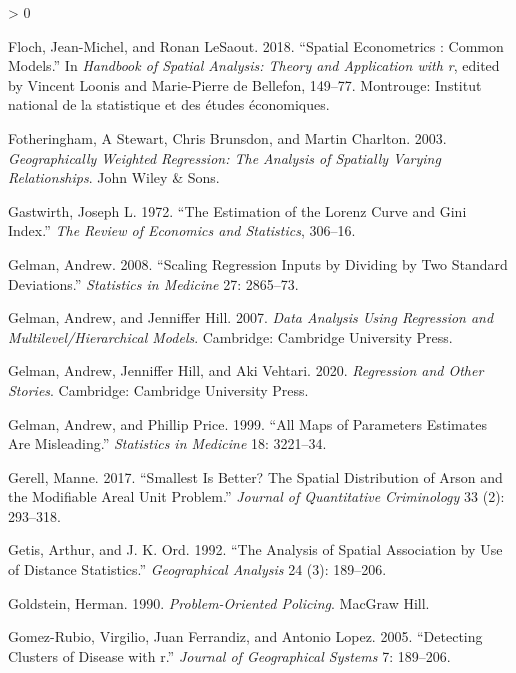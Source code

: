\documentclass[
  krantz2]{krantz}
\newlength{\cslhangindent}
\newenvironment{CSLReferences}[2] %
 {%
  \setlength{\parindent}{0pt}
  \ifodd #1 \everypar{\setlength{\hangindent}{\cslhangindent}}\ignorespaces\fi
  \ifnum #2 > 0
  \setlength{\parskip}{#2\baselineskip}
  \fi
 }%
 {}
\begin{document}
\begin{CSLReferences}{1}{0}
\leavevmode\hypertarget{ref-Floch_2018}{}%
Floch, Jean-Michel, and Ronan LeSaout. 2018. {``Spatial Econometrics : Common Models.''} In \emph{Handbook of Spatial Analysis: Theory and Application with r}, edited by Vincent Loonis and Marie-Pierre de Bellefon, 149--77. Montrouge: Institut national de la statistique et des études économiques.

\leavevmode\hypertarget{ref-Fotheringham_2003}{}%
Fotheringham, A Stewart, Chris Brunsdon, and Martin Charlton. 2003. \emph{Geographically Weighted Regression: The Analysis of Spatially Varying Relationships}. John Wiley \& Sons.

\leavevmode\hypertarget{ref-gastwirth1972estimation}{}%
Gastwirth, Joseph L. 1972. {``The Estimation of the Lorenz Curve and Gini Index.''} \emph{The Review of Economics and Statistics}, 306--16.

\leavevmode\hypertarget{ref-Gelman_2008}{}%
Gelman, Andrew. 2008. {``Scaling Regression Inputs by Dividing by Two Standard Deviations.''} \emph{Statistics in Medicine} 27: 2865--73.

\leavevmode\hypertarget{ref-Gelman_2007}{}%
Gelman, Andrew, and Jenniffer Hill. 2007. \emph{Data Analysis Using Regression and Multilevel/Hierarchical Models}. Cambridge: Cambridge University Press.

\leavevmode\hypertarget{ref-Gelman_2020}{}%
Gelman, Andrew, Jenniffer Hill, and Aki Vehtari. 2020. \emph{Regression and Other Stories}. Cambridge: Cambridge University Press.

\leavevmode\hypertarget{ref-Gelman_1999}{}%
Gelman, Andrew, and Phillip Price. 1999. {``All Maps of Parameters Estimates Are Misleading.''} \emph{Statistics in Medicine} 18: 3221--34.

\leavevmode\hypertarget{ref-Gerell_2017}{}%
Gerell, Manne. 2017. {``Smallest Is Better? The Spatial Distribution of Arson and the Modifiable Areal Unit Problem.''} \emph{Journal of Quantitative Criminology} 33 (2): 293--318.

\leavevmode\hypertarget{ref-Getis_1992}{}%
Getis, Arthur, and J. K. Ord. 1992. {``The Analysis of Spatial Association by Use of Distance Statistics.''} \emph{Geographical Analysis} 24 (3): 189--206.

\leavevmode\hypertarget{ref-Goldstein_1990}{}%
Goldstein, Herman. 1990. \emph{Problem-Oriented Policing}. MacGraw Hill.

\leavevmode\hypertarget{ref-Gomez_2005}{}%
Gomez-Rubio, Virgilio, Juan Ferrandiz, and Antonio Lopez. 2005. {``Detecting Clusters of Disease with r.''} \emph{Journal of Geographical Systems} 7: 189--206.


\end{CSLReferences}
\end{document}
